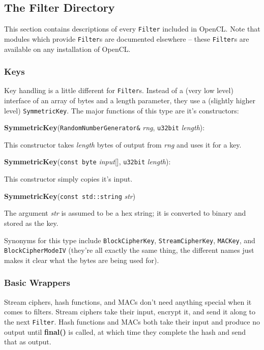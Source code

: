 \documentclass{article}
\newcommand{\function}[1]{\textbf{#1}}
\newcommand{\type}[1]{\texttt{#1}}
\renewcommand{\arg}[1]{\textsl{#1}}
\begin{document}
\pagebreak

\subsection{The Filter Directory}

This section contains descriptions of every \type{Filter} included in OpenCL.
Note that modules which provide \type{Filter}s are documented elsewhere --
these \type{Filter}s are available on any installation of OpenCL.

\subsubsection{Keys}

Key handling is a little different for \type{Filter}s. Instead of a (very low
level) interface of an array of bytes and a length parameter, they use a
(slightly higher level) \type{SymmetricKey}. The major functions of this type
are it's constructors:

\vskip 5pt \noindent
\function{SymmetricKey}(\type{RandomNumberGenerator\&} \arg{rng}, \type{u32bit}
\arg{length}):

This constructor takes \arg{length} bytes of output from \arg{rng} and uses it
for a key.

\vskip 5pt \noindent
\function{SymmetricKey}(\type{const byte} \arg{input}[], \type{u32bit}
\arg{length}):

This constructor simply copies it's input.

\vskip 5pt \noindent
\function{SymmetricKey}(\type{const std::string} \arg{str})

The argument \arg{str} is assumed to be a hex string; it is converted to binary
and stored as the key.

\vskip 10pt
Synonyms for this type include \type{BlockCipherKey}, \type{StreamCipherKey},
\type{MACKey}, and \type{BlockCipherModeIV} (they're all exactly the same
thing, the different names just makes it clear what the bytes are being used
for).

\subsubsection{Basic Wrappers}

Stream ciphers, hash functions, and MACs don't need anything special when it
comes to filters. Stream ciphers take their input, encrypt it, and send it
along to the next \type{Filter}. Hash functions and MACs both take their input
and produce no output until \function{final()} is called, at which time they
complete the hash and send that as output.
\end{document}
